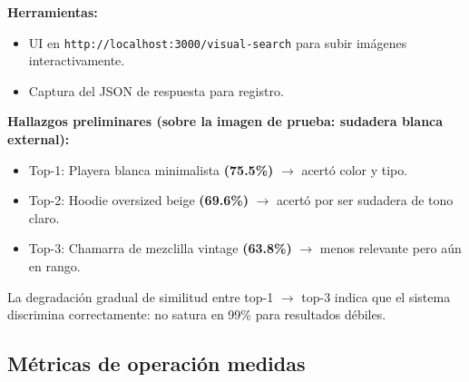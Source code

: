 \documentclass[11pt,letterpaper]{article}
\begin{document}
\textbf{Herramientas:}
\begin{itemize}[leftmargin=*]
  \item UI en \texttt{http://localhost:3000/visual-search} para subir imágenes interactivamente.
  \item Captura del JSON de respuesta para registro.
\end{itemize}

\textbf{Hallazgos preliminares (sobre la imagen de prueba: sudadera blanca external):}
\begin{itemize}[leftmargin=*]
  \item Top-1: Playera blanca minimalista \textbf{(75.5\%)} $\rightarrow$ acertó color y tipo.
  \item Top-2: Hoodie oversized beige \textbf{(69.6\%)} $\rightarrow$ acertó por ser sudadera de tono claro.
  \item Top-3: Chamarra de mezclilla vintage \textbf{(63.8\%)} $\rightarrow$ menos relevante pero aún en rango.
\end{itemize}
La degradación gradual de similitud entre top-1 $\rightarrow$ top-3 indica que el sistema discrimina correctamente: no satura en 99\% para resultados débiles.

\subsection{Métricas de operación medidas}
\end{document}
